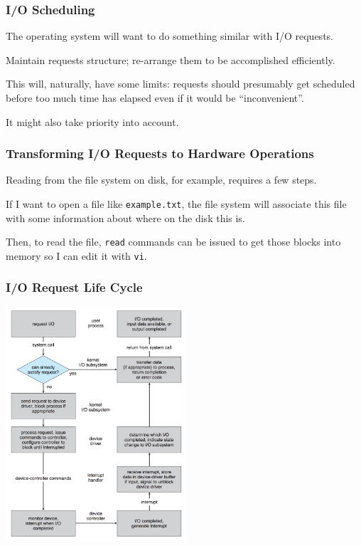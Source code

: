 \begin{frame}
\frametitle{I/O Scheduling}
The operating system will want to do something similar with I/O requests.

Maintain requests structure; re-arrange them to be accomplished efficiently.

This will, naturally, have some limits: requests should presumably get scheduled before too much time has elapsed even if it would be ``inconvenient''. 

It might also take priority into account. 

\end{frame}



\begin{frame}
\frametitle{Transforming I/O Requests to Hardware Operations}

Reading from the file system on disk, for example, requires a few steps. 

If I want to open a file like \texttt{example.txt}, the file system will associate this file with some information about where on the disk this is. 

Then, to read the file, \texttt{read} commands can be issued to get those blocks into memory so I can edit it with \texttt{vi}.

\end{frame}

\begin{frame}
\frametitle{I/O Request Life Cycle}

\begin{center}
	\includegraphics[width=0.5\textwidth]{images/io-lifecycle.png}
\end{center}

\end{frame}



